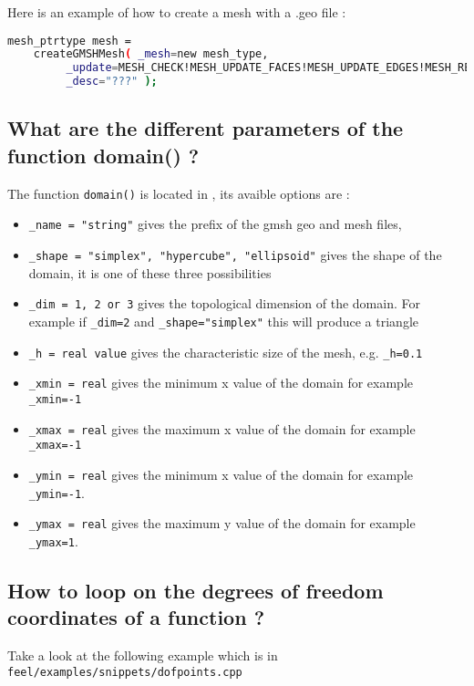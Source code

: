 Here is an example of how to create a mesh with a .geo file :
\begin{lstlisting}[language=sh]
 mesh_ptrtype mesh = 
	createGMSHMesh( _mesh=new mesh_type,
         _update=MESH_CHECK!MESH_UPDATE_FACES!MESH_UPDATE_EDGES!MESH_RENUMBER,
         _desc="???" );
\end{lstlisting}


\subsection{What are the different parameters of the function domain() ?}
The function \lstinline!domain()! is located in \lstinline!!, its avaible options are :
\begin{itemize}
\item \lstinline!_name = "string"! gives the prefix of the gmsh geo and mesh files,
\item \lstinline!_shape = "simplex", "hypercube", "ellipsoid"! gives the shape of the domain, it is one of these three possibilities
\item \lstinline!_dim = 1, 2 or 3! gives the topological dimension of the domain. For example if \lstinline!_dim=2! and \lstinline!_shape="simplex"! this will produce a triangle
\item \lstinline!_h = real value! gives the characteristic size of the mesh, e.g. \lstinline!_h=0.1!
\item \lstinline!_xmin = real! gives the minimum x value of the domain for example \lstinline!_xmin=-1!
\item \lstinline!_xmax = real! gives the maximum x value of the domain for example \lstinline!_xmax=-1!
\item \lstinline!_ymin = real! gives the minimum x value of the domain for example \lstinline!_ymin=-1!.
\item \lstinline!_ymax = real!  gives the maximum y value of the domain for example \lstinline!_ymax=1!.

\end{itemize}


\subsection{How to loop on the degrees of freedom coordinates of a function ?}

Take a look at the following example which is in \lstinline!feel/examples/snippets/dofpoints.cpp! 




